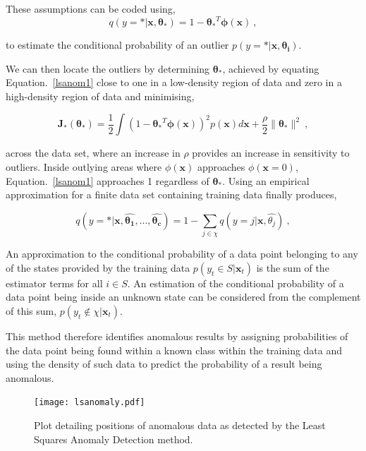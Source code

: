 These assumptions can be coded using,
\begin{equation}
    q(y=\ast|\mathbf{x},\mathbf{\theta_{\ast}}) = 1 - \mathbf{\theta_{\ast}}^T\mathbf{\phi}(\mathbf{x})~,
        \label{lsanom1}
\end{equation}

to estimate the conditional probability of an outlier $p(y=\ast|\mathbf{x},\mathbf{\theta_i})$.

We can then locate the outliers by determining $\mathbf{\theta_{\ast}}$, achieved by equating Equation.~\eqref{lsanom1} close to one in a low-density region of data and zero in a high-density region of data and minimising,

\begin{equation}
\mathbf{J_{\ast}}(\mathbf{\theta_{\ast}}) = \dfrac{1}{2}\int(1 - \mathbf{\theta_{\ast}}^T\mathbf{\phi}(\mathbf{x}))^2p(\mathbf{x})d\mathbf{x} + \dfrac{\rho}{2}\|\mathbf{\theta_{\ast}}\|^2~,
\end{equation}

across the data set, where an increase in $\rho$ provides an increase in sensitivity to outliers. Inside outlying areas where $\phi(\mathbf{x})$ approaches $\phi(\mathbf{x}=0)$, Equation.~\eqref{lsanom1} approaches 1 regardless of $\mathbf{\theta_{\ast}}$. Using an empirical approximation for a finite data set containing training data finally produces,

\begin{equation}
q(y=\ast|\mathbf{x}, \mathbf{\widehat{\theta_{1}}},..., \mathbf{\widehat{\theta_{c}}}) = 1 - \sum_{j \in \chi}^{} q(y=j|\mathbf{x}, \widehat{\theta_{j}})~,
\end{equation}

An approximation to the conditional probability of a data point belonging to any of the states provided by the training data $p(y_t \in S|\mathbf{x}_t)$ is the sum of the estimator terms for all $i \in S$. An estimation of the conditional probability of a data point being inside an unknown state can be considered from the complement of this sum, $p(y_t \notin \chi|\mathbf{x}_t)$.

This method therefore identifies anomalous results by assigning probabilities of the data point being found within a known class within the training data and using the density of such data to predict the probability of a result being anomalous. 

\begin{figure}[t]
    \texttt{[image: lsanomaly.pdf]}
    \caption[Least Squares Anomaly Score]{Plot detailing positions of anomalous data as detected by the Least Squares Anomaly Detection method.}
    \label{fig:lsanomaly}
\end{figure}

